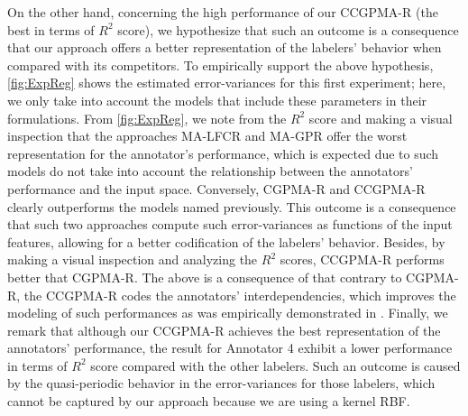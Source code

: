 \documentclass[9pt]{article}
\begin{document}
On the other hand, concerning the high performance of our CCGPMA-R (the best in terms of $R^2$ score), we hypothesize that such an outcome is a consequence that our approach offers a better representation of the labelers' behavior when compared with its competitors. To empirically support the above hypothesis, \cref{fig:ExpReg} shows the estimated error-variances for this first experiment; here, we only take into account the models that include these parameters in their formulations. From \cref{fig:ExpReg}, we note from the $R^2$ score and making a visual inspection that the approaches MA-LFCR and MA-GPR offer the worst representation for the annotator's performance, which is expected due to such models do not take into account the relationship between the annotators' performance and the input space. Conversely, CGPMA-R and CCGPMA-R clearly outperforms the models named previously. This outcome is a consequence that such two approaches compute such error-variances as functions of the input features, allowing for a better codification of the labelers' behavior. Besides, by making a visual inspection and analyzing the $R^2$ scores, CCGPMA-R performs better that CGPMA-R. The above is a consequence of that contrary to CGPMA-R, the CCGPMA-R codes the annotators' interdependencies, which improves the modeling of such performances as was empirically demonstrated in \cite{zhu2019unsupervised}. Finally, we remark that although our CCGPMA-R achieves the best representation of the annotators' performance, the result for Annotator 4 exhibit a lower performance in terms of $R^2$ score compared with the other labelers. Such an outcome is caused by the quasi-periodic behavior in the error-variances for those labelers, which cannot be captured by our approach because we are using a kernel RBF.
\end{document}
